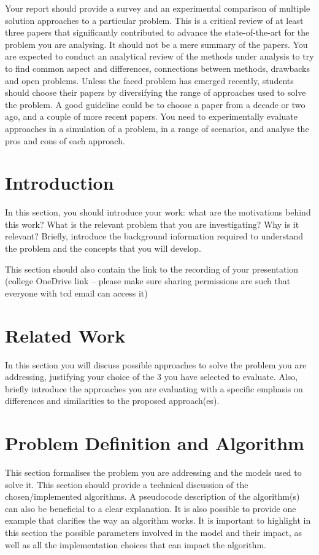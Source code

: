 \documentclass{svproc}
\begin{document}
Your report should provide a survey and an experimental comparison of multiple solution approaches to a particular problem. This is a critical review of at least three papers that significantly contributed to advance the state-of-the-art for the problem you are analysing. It should not be a mere summary of the papers. You are expected to conduct an analytical review of the methods under analysis to try to find common aspect and differences, connections between methods, drawbacks and open problems. Unless the faced problem has emerged recently, students should choose their papers by diversifying the range of approaches used to solve the problem. A good guideline could be to choose a paper from a decade or two ago, and a couple of more recent papers. You need to experimentally evaluate approaches in a simulation of a problem, in a range of scenarios, and analyse the pros and cons of each approach. 

\section{Introduction}
In this section, you should introduce your work: what are the motivations behind this work? What is the relevant problem that you are investigating? Why is it relevant? 
Briefly, introduce the background information required to understand the problem and the concepts that you will develop. 

This section should also contain the link to the recording of your presentation (college OneDrive link – please make sure sharing permissions are such that everyone with tcd email can access it)

\section{Related Work}
In this section you will discuss possible approaches to solve the problem you are addressing, justifying your choice of the 3 you have selected to evaluate. Also, briefly introduce the approaches you are evaluating with a specific emphasis on differences and similarities to the proposed approach(es).

\section{Problem Definition and Algorithm}
This section formalises the problem you are addressing and the models used to solve it. This section should provide a technical discussion of the chosen/implemented algorithms. A pseudocode description of the algorithm(s) can also be beneficial to a clear explanation. It is also possible to provide one example that clarifies the way an algorithm works. It is important to highlight in this section the possible parameters involved in the model and their impact, as well as all the implementation choices that can impact the algorithm.
\end{document}
